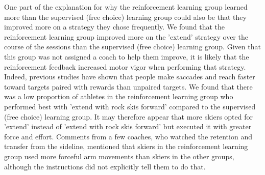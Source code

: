 One part of the explanation for why the reinforcement learning group learned more than the supervised (free choice) learning group could also be that they improved more on a strategy they chose frequently.  We found that the reinforcement learning group improved more on the 'extend' strategy over the course of the sessions than the supervised (free choice) learning group. Given that this group was not assigned a coach to help them improve, it is likely that the reinforcement feedback increased motor vigor \cite{shadmehr_vigor_2020, pietro_mazzoni_why_2007, niv_normative_2006} when performing that strategy. Indeed, previous studies have shown that people make saccades \cite{takikawa_modulation_2002} and reach faster \cite{summerside_vigor_2018} toward targets paired with rewards than unpaired targets. We found that there was a low proportion of athletes in the reinforcement learning group who performed best with 'extend with rock skis forward' compared to the supervised (free choice) learning group. It may therefore appear that more skiers opted for 'extend' instead of 'extend with rock skis forward' but executed it with greater force and effort. Comments from a few coaches, who watched the retention and transfer from the sideline, mentioned that skiers in the reinforcement learning group used more forceful arm movements than skiers in the other groups, although the instructions did not explicitly tell them to do that.